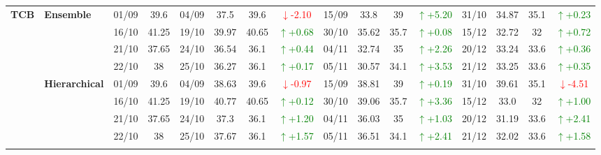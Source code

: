 {\begin{longtable}{llcc|cccc|cccc|cccc}
\multirow{12}{*}{\textbf{TCB}} 
& \textbf{Ensemble}
& 01/09 & 39.6 & 04/09 & 37.5 & 39.6 & \textcolor{red}{\(\downarrow\)-2.10} & 15/09 & 33.8 & 39 & \textcolor{green}{\(\uparrow\)+5.20} & 31/10 & 34.87 & 35.1 & \textcolor{green}{\(\uparrow\)+0.23} \\

&
& 16/10 & 41.25 & 19/10 & 39.97 & 40.65 & \textcolor{green}{\(\uparrow\)+0.68} & 30/10 & 35.62 & 35.7 & \textcolor{green}{\(\uparrow\)+0.08} & 15/12 & 32.72 & 32 & \textcolor{green}{\(\uparrow\)+0.72} \\

&
& 21/10 & 37.65 & 24/10 & 36.54 & 36.1 & \textcolor{green}{\(\uparrow\)+0.44} & 04/11 & 32.74 & 35 & \textcolor{green}{\(\uparrow\)+2.26} & 20/12 & 33.24 & 33.6 & \textcolor{green}{\(\uparrow\)+0.36} \\

&
& 22/10 & 38 & 25/10 & 36.27 & 36.1 & \textcolor{green}{\(\uparrow\)+0.17} & 05/11 & 30.57 & 34.1 & \textcolor{green}{\(\uparrow\)+3.53} & 21/12 & 33.25 & 33.6 & \textcolor{green}{\(\uparrow\)+0.35} \\
\cmidrule(lr){2-16}


& \textbf{Hierarchical}
& 01/09 & 39.6 & 04/09 & 38.63 & 39.6 & \textcolor{red}{\(\downarrow\)-0.97} & 15/09 & 38.81 & 39 & \textcolor{green}{\(\uparrow\)+0.19} & 31/10 & 39.61 & 35.1 & \textcolor{red}{\(\downarrow\)-4.51} \\

&
& 16/10 & 41.25 & 19/10 & 40.77 & 40.65 & \textcolor{green}{\(\uparrow\)+0.12} & 30/10 & 39.06 & 35.7 & \textcolor{green}{\(\uparrow\)+3.36} & 15/12 & 33.0 & 32 & \textcolor{green}{\(\uparrow\)+1.00} \\

&
& 21/10 & 37.65 & 24/10 & 37.3 & 36.1 & \textcolor{green}{\(\uparrow\)+1.20} & 04/11 & 36.03 & 35 & \textcolor{green}{\(\uparrow\)+1.03} & 20/12 & 31.19 & 33.6 & \textcolor{green}{\(\uparrow\)+2.41} \\

&
& 22/10 & 38 & 25/10 & 37.67 & 36.1 & \textcolor{green}{\(\uparrow\)+1.57} & 05/11 & 36.51 & 34.1 & \textcolor{green}{\(\uparrow\)+2.41} & 21/12 & 32.02 & 33.6 & \textcolor{green}{\(\uparrow\)+1.58} \\
\cmidrule(lr){2-16}




\end{longtable}}
